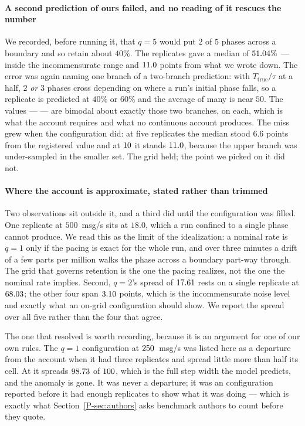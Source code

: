 \documentclass[10pt,journal,onecolumn]{IEEEtran}
\newcommand{\mainAuthors}{\ref{P-sec:authors}}        %
\begin{document}
\paragraph{A second prediction of ours failed, and no reading of it rescues the number} We recorded,
before running it, that $q=5$ would put $2$ of $5$ phases across a boundary and so retain about
$40\%$. The \armSixTwentyFiveNWord{} replicates gave a median of $51.04\%$ ---
inside the incommensurate range and $11.0$
points from what we wrote down. The error was again naming one branch of a two-branch prediction:
with $T_{\mathrm{true}}/\tau$ at a half, $2$ \emph{or} $3$ phases cross depending on where a run's
initial phase falls, so a replicate is predicted at $40\%$ or $60\%$ and the average of many is near
$50$. The values --- \armSixTwentyFiveReplicates{} --- are bimodal about exactly those
two branches, \armSixTwentyFiveLowerWord{} on each, which is what the account requires and what no
continuous account produces. The miss grew when the configuration did: at five replicates the median stood
$6.6$ points from the registered value and at $10$ it stands
$11.0$, because the upper branch was under-sampled in the smaller set. The
grid held; the point we picked on it did not.

\paragraph{Where the account is approximate, stated rather than trimmed} Two observations sit
outside it, and a third did until the configuration was filled. One
replicate at $500$~msg/s sits at $18.0$, which a run confined to a single phase cannot produce. We
read this as the limit of the idealization: a nominal rate is $q=1$ only if the pacing is exact for
the whole run, and over three minutes a drift of a few parts per million walks the phase across a
boundary part-way through. The grid that governs retention is the one the pacing realizes, not the
one the nominal rate implies. Second, $q=2$'s spread of $17.61$ rests on a single
replicate at $68.03$;
the other four span $3.10$ points, which is the incommensurate noise level
and exactly what an on-grid
configuration should show. We report the spread over all five rather than the four that agree.

The one that resolved is worth recording, because it is an argument for one of our own rules.
The $q=1$ configuration at $250$~msg/s was listed here as a departure from the account when
it had three replicates and spread little more than half its cell. At \armTwoFiftyNWord{} it
spreads $98.73$ of $100$, which is the full step width the model
predicts, and the anomaly is gone. It was never a departure; it was an configuration reported before it
had enough replicates to show what it was doing --- which is exactly what
Section~\mainAuthors{} asks benchmark authors to count before they quote.
\end{document}
